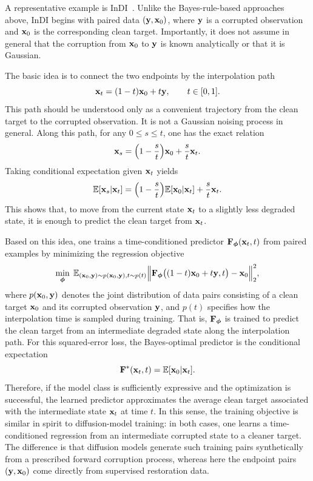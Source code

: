 A representative example is InDI~\citep{delbracio2023inversion}. Unlike the Bayes-rule-based approaches above, InDI begins with paired data $({\mathbf{y}},{\mathbf{x}}_0)$, where ${\mathbf{y}}$ is a corrupted observation and ${\mathbf{x}}_0$ is the corresponding clean target. Importantly, it does not assume in general that the corruption from ${\mathbf{x}}_0$ to ${\mathbf{y}}$ is known analytically or that it is Gaussian. 

The basic idea is to connect the two endpoints by the interpolation path
\[
{\mathbf{x}}_t=(1-t){\mathbf{x}}_0+t{\mathbf{y}},\qquad t\in[0,1].
\]
This path should be understood only as a convenient trajectory from the clean target to the corrupted observation. It is not a Gaussian noising process in general. Along this path, for any $0\le s\le t$, one has the exact relation
\[
{\mathbf{x}}_s=\Bigl(1-\frac{s}{t}\Bigr){\mathbf{x}}_0+\frac{s}{t}{\mathbf{x}}_t.
\]
Taking conditional expectation given ${\mathbf{x}}_t$ yields
\[
\mathbb E[{\mathbf{x}}_s|{\mathbf{x}}_t]
=
\Bigl(1-\frac{s}{t}\Bigr)\mathbb E[{\mathbf{x}}_0|{\mathbf{x}}_t]
+
\frac{s}{t}{\mathbf{x}}_t.
\]
This shows that, to move from the current state ${\mathbf{x}}_t$ to a slightly less degraded state, it is enough to predict the clean target from ${\mathbf{x}}_t$.

Based on this idea, one trains a time-conditioned predictor ${\mathbf{F}}_{{\bm{\phi}}}({\mathbf{x}}_t,t)$ from paired examples by minimizing the regression objective
\[
\min_{{\bm{\phi}}}\;
\mathbb E_{({\mathbf{x}}_0,{\mathbf{y}})\sim p({\mathbf{x}}_0,{\mathbf{y}}),  t\sim p(t)}
\Bigl\|
{\mathbf{F}}_{{\bm{\phi}}}\bigl((1-t){\mathbf{x}}_0+t{\mathbf{y}}, t\bigr)-{\mathbf{x}}_0
\Bigr\|_2^2,
\]
where $p({\mathbf{x}}_0,{\mathbf{y}})$ denotes the joint distribution of data pairs consisting of a clean target ${\mathbf{x}}_0$ and its corrupted observation ${\mathbf{y}}$, and $p(t)$ specifies how the interpolation time is sampled during training.
That is, ${\mathbf{F}}_{{\bm{\phi}}}$ is trained to predict the clean target from an intermediate degraded state along the interpolation path. For this squared-error loss, the Bayes-optimal predictor is the conditional expectation
\[
{\mathbf{F}}^*({\mathbf{x}}_t,t)=\mathbb E[{\mathbf{x}}_0|{\mathbf{x}}_t].
\]
Therefore, if the model class is sufficiently expressive and the optimization is successful, the learned predictor approximates the average clean target associated with the intermediate state ${\mathbf{x}}_t$ at time $t$. In this sense, the training objective is similar in spirit to diffusion-model training: in both cases, one learns a time-conditioned regression from an intermediate corrupted state to a cleaner target. The difference is that diffusion models generate such training pairs synthetically from a prescribed forward corruption process, whereas here the endpoint pairs $({\mathbf{y}},{\mathbf{x}}_0)$ come directly from supervised restoration data.

